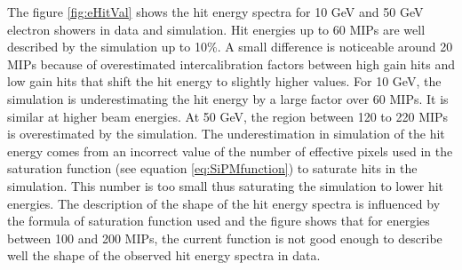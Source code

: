 The figure \ref{fig:eHitVal} shows the hit energy spectra for 10 GeV and 50 GeV electron showers in data and simulation. Hit energies up to 60 MIPs are well described by the simulation up to 10\%. A small difference is noticeable around 20 MIPs because of overestimated intercalibration factors between high gain hits and low gain hits that shift the hit energy to slightly higher values. For 10 GeV, the simulation is underestimating the hit energy by a large factor over 60 MIPs. It is similar at higher beam energies. At 50 GeV, the region between 120 to 220 MIPs is overestimated by the simulation. The underestimation in simulation of the hit energy comes from an incorrect value of the number of effective pixels used in the saturation function (see equation \ref{eq:SiPMfunction}) to saturate hits in the simulation. This number is too small thus saturating the simulation to lower hit energies. The description of the shape of the hit energy spectra is influenced by the formula of saturation function used \cite{Kotera:2015rha} and the figure shows that for energies between 100 and 200 MIPs, the current function is not good enough to describe well the shape of the observed hit energy spectra in data.

